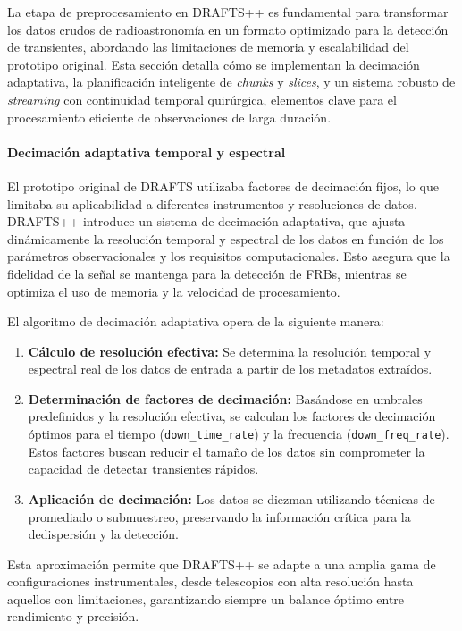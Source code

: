 La etapa de preprocesamiento en DRAFTS++ es fundamental para transformar los datos crudos de radioastronomía en un formato optimizado para la detección de transientes, abordando las limitaciones de memoria y escalabilidad del prototipo original. Esta sección detalla cómo se implementan la decimación adaptativa, la planificación inteligente de \emph{chunks} y \emph{slices}, y un sistema robusto de \emph{streaming} con continuidad temporal quirúrgica, elementos clave para el procesamiento eficiente de observaciones de larga duración.

\paragraph{Decimación adaptativa temporal y espectral}

El prototipo original de DRAFTS utilizaba factores de decimación fijos, lo que limitaba su aplicabilidad a diferentes instrumentos y resoluciones de datos. DRAFTS++ introduce un sistema de decimación adaptativa, que ajusta dinámicamente la resolución temporal y espectral de los datos en función de los parámetros observacionales y los requisitos computacionales. Esto asegura que la fidelidad de la señal se mantenga para la detección de FRBs, mientras se optimiza el uso de memoria y la velocidad de procesamiento.

El algoritmo de decimación adaptativa opera de la siguiente manera:
\begin{enumerate}
    \item \textbf{Cálculo de resolución efectiva:} Se determina la resolución temporal y espectral real de los datos de entrada a partir de los metadatos extraídos.
    \item \textbf{Determinación de factores de decimación:} Basándose en umbrales predefinidos y la resolución efectiva, se calculan los factores de decimación óptimos para el tiempo (\texttt{down\_time\_rate}) y la frecuencia (\texttt{down\_freq\_rate}). Estos factores buscan reducir el tamaño de los datos sin comprometer la capacidad de detectar transientes rápidos.
    \item \textbf{Aplicación de decimación:} Los datos se diezman utilizando técnicas de promediado o submuestreo, preservando la información crítica para la dedispersión y la detección.
\end{enumerate}

Esta aproximación permite que DRAFTS++ se adapte a una amplia gama de configuraciones instrumentales, desde telescopios con alta resolución hasta aquellos con limitaciones, garantizando siempre un balance óptimo entre rendimiento y precisión.

